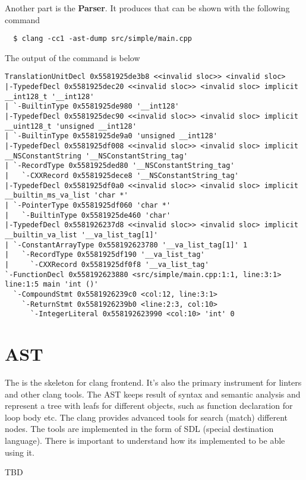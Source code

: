 Another part is the \textbf{Parser}. It produces  that
can be shown with the following command
\begin{verbatim}
  $ clang -cc1 -ast-dump src/simple/main.cpp
  \end{verbatim}
The output of the command is below
\begin{verbatim}
TranslationUnitDecl 0x5581925de3b8 <<invalid sloc>> <invalid sloc>
|-TypedefDecl 0x5581925dec20 <<invalid sloc>> <invalid sloc> implicit __int128_t '__int128'
| `-BuiltinType 0x5581925de980 '__int128'
|-TypedefDecl 0x5581925dec90 <<invalid sloc>> <invalid sloc> implicit __uint128_t 'unsigned __int128'
| `-BuiltinType 0x5581925de9a0 'unsigned __int128'
|-TypedefDecl 0x5581925df008 <<invalid sloc>> <invalid sloc> implicit __NSConstantString '__NSConstantString_tag'
| `-RecordType 0x5581925ded80 '__NSConstantString_tag'
|   `-CXXRecord 0x5581925dece8 '__NSConstantString_tag'
|-TypedefDecl 0x5581925df0a0 <<invalid sloc>> <invalid sloc> implicit __builtin_ms_va_list 'char *'
| `-PointerType 0x5581925df060 'char *'
|   `-BuiltinType 0x5581925de460 'char'
|-TypedefDecl 0x5581926237d8 <<invalid sloc>> <invalid sloc> implicit __builtin_va_list '__va_list_tag[1]'
| `-ConstantArrayType 0x558192623780 '__va_list_tag[1]' 1
|   `-RecordType 0x5581925df190 '__va_list_tag'
|     `-CXXRecord 0x5581925df0f8 '__va_list_tag'
`-FunctionDecl 0x558192623880 <src/simple/main.cpp:1:1, line:3:1> line:1:5 main 'int ()'
  `-CompoundStmt 0x5581926239c0 <col:12, line:3:1>
    `-ReturnStmt 0x5581926239b0 <line:2:3, col:10>
      `-IntegerLiteral 0x558192623990 <col:10> 'int' 0
\end{verbatim}

\section{AST}
The  is the skeleton for clang frontend. It's also the primary
instrument for linters and other clang tools. The AST keeps result of syntax and
semantic analysis and represent a tree with leafs for different objects, such as
function declaration for loop body etc. The clang provides advanced tools for
search (match) different nodes. The tools are implemented in the form of SDL
(special destination language). There is important to understand how its
implemented to be able using it.

TBD
